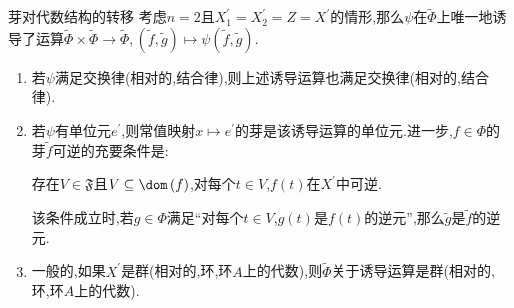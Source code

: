 \begin{remark}{芽对代数结构的转移}{}
	考虑$n=2$且$X_{1}^{\prime}=X_{2}^{\prime}=Z=X^{\prime}$的情形,那么$\psi$在$\tilde{\Phi}$上唯一地诱导了运算$\tilde{\Phi}\times\tilde{\Phi}\to\tilde{\Phi},\left(\tilde{f},\tilde{g}\right)\mapsto\psi\left(\tilde{f},\tilde{g}\right)$.
	\begin{enumerate}
		\item 若$\psi$满足交换律(相对的,结合律),则上述诱导运算也满足交换律(相对的,结合律).
		\item 若$\psi$有单位元$e^{\prime}$,则常值映射$x\mapsto e^{\prime}$的芽是该诱导运算的单位元.进一步,$f\in\Phi$的芽$\tilde{f}$可逆的充要条件是:
		\begin{center}
			存在$V\in\mathfrak{F}$且$V\subseteq\dom\left(f\right)$,对每个$t\in V$,$f\left(t\right)$在$X^{\prime}$中可逆.
		\end{center}
		该条件成立时,若$g\in\Phi$满足``对每个$t\in V$,$g\left(t\right)$是$f\left(t\right)$的逆元'',那么$\tilde{g}$是$\tilde{f}$的逆元.
		\item 一般的,如果$X^{\prime}$是群(相对的,环,环$A$上的代数),则$\tilde{\Phi}$关于诱导运算是群(相对的,环,环$A$上的代数).
	\end{enumerate}
\end{remark}










